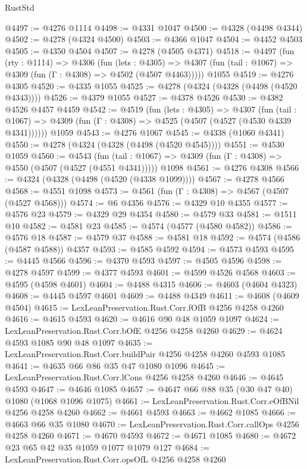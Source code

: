 \begin{lexlean}{RustStd}
\begin{coremodule}
{\begin{coremodule}
{{{{{{{{{{{{{{{{{{{{{{{{{{{{{{{{{{{@4497 := @4276 @1114
@4498 := @4331 @1047
@4500 := @4328 (@4498 @4344)
@4502 := @4278 (@4324 @4500)
@4503 := @4366 @1047
@4504 := @4452 @4503
@4505 := @4350 @4504
@4507 := @4278 (@4505 @4371)
@4518 := @4497
    (fun (rty : @1114) =>
    @4306
      (fun (lets : @4305) =>
      @4307 (fun (tail : @1067) => @4309 (fun (Γ : @4308) => @4502 (@4507 @4463)))))
    @1055
@4519 := @4276 @4305
@4520 := @4335 @1055
@4525 := @4278 (@4324 (@4328 (@4498 (@4520 @4343))))
@4526 := @4379 @1055
@4527 := @4378 @4526
@4530 := @4382 @4526 @4457 @4459
@4542 := @4519
    (fun (lets : @4305) =>
    @4307
      (fun (tail : @1067) => @4309 (fun (Γ : @4308) => @4525 (@4507 (@4527 (@4530 @4339 @4341))))))
    @1059
@4543 := @4276 @1067
@4545 := @4338 (@1060 @4341)
@4550 := @4278 (@4324 (@4328 (@4498 (@4520 @4545))))
@4551 := @4530 @1059
@4560 := @4543
    (fun (tail : @1067) => @4309 (fun (Γ : @4308) => @4550 (@4507 (@4527 (@4551 @4341)))))
    @1098
@4561 := @4276 @4308
@4566 := @4324 (@4328 (@4498 (@4520 (@4338 @1099))))
@4567 := @4278 @4566
@4568 := @4551 @1098
@4573 := @4561 (fun (Γ : @4308) => @4567 (@4507 (@4527 @4568)))
@4574 := @6 @4356
@4576 := @4329 @10 @4355
@4577 := @4576 @23
@4579 := @4329 @29 @4354
@4580 := @4579 @33
@4581 := @1511 @10
@4582 := @4581 @23
@4585 := @4574 (@4577 (@4580 @4582))
@4586 := @4576 @18
@4587 := @4579 @37
@4588 := @4581 @18
@4592 := @4574 (@4586 (@4587 @4588)) @4357
@4593 := @4585 @4592
@4594 := @4573 @4593
@4595 := @4445 @4566
@4596 := @4370 @4593
@4597 := @4505 @4596
@4598 := @4278 @4597
@4599 := @4377 @4593
@4601 := @4599 @4526 @4568
@4603 := @4595 (@4598 @4601)
@4604 := @4488 @4315
@4606 := @4603 (@4604 @4323)
@4608 := @4445 @4597 @4601
@4609 := @4488 @4349
@4611 := @4608 (@4609 @4504)
@4615 := LexLeanPreservation.Rust.Corr.fOfB @4256 @4258 @4260
@4616 := @4615 @4593
@4620 := @4616 @90 @48 @1059 @1097
@4624 := LexLeanPreservation.Rust.Corr.bOfE @4256 @4258 @4260
@4629 := @4624 @4593 @1085 @90 @48 @1097
@4635 := LexLeanPreservation.Rust.Corr.buildPair @4256 @4258 @4260 @4593 @1085
@4641 := @4635 @66 @86 @35 @47 @1080 @1096
@4645 := LexLeanPreservation.Rust.Corr.lCons @4256 @4258 @4260
@4646 := @4645 @4593
@4647 := @4646 @1085
@4657 := @4647 @66 @88 @35 (@30 @47 @40) @1080 (@1068 @1096 @1075)
@4661 := LexLeanPreservation.Rust.Corr.eOfBNil @4256 @4258 @4260
@4662 := @4661 @4593
@4663 := @4662 @1085
@4666 := @4663 @66 @35 @1080
@4670 := LexLeanPreservation.Rust.Corr.callOps @4256 @4258 @4260
@4671 := @4670 @4593
@4672 := @4671 @1085
@4680 := @4672 @23 @65 @42 @35 @1059 @1077 @1079 @127
@4684 := LexLeanPreservation.Rust.Corr.opsOfL @4256 @4258 @4260
}}}}}}}}}}}}}}}}}}}}}}}}}}}}}}}}}}}
\end{coremodule}}
\end{coremodule}
\end{lexlean}
